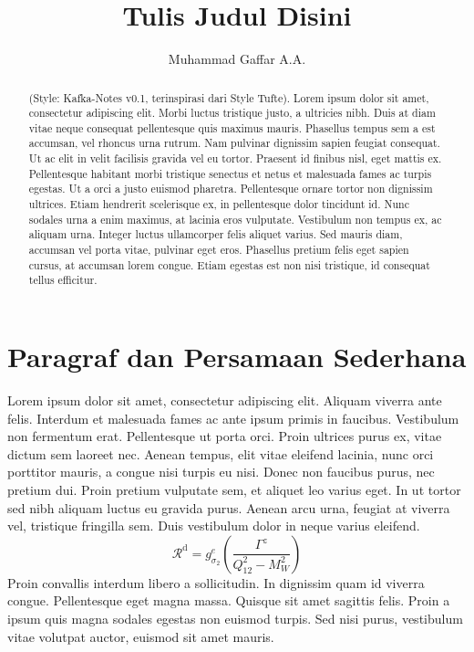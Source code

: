\documentclass{article}
\title{Tulis Judul Disini}
\author{Muhammad Gaffar A.A.}
\begin{document}
\begin{titlepage}
\thispagestyle{empty}
\maketitle
\begin{abstract}
(Style: Kafka-Notes v0.1, terinspirasi dari Style Tufte). Lorem ipsum dolor sit amet, consectetur adipiscing elit. Morbi luctus tristique justo, a ultricies nibh. Duis at diam vitae neque consequat pellentesque quis maximus mauris. Phasellus tempus sem a est accumsan, vel rhoncus urna rutrum. Nam pulvinar dignissim sapien feugiat consequat. Ut ac elit in velit facilisis gravida vel eu tortor. Praesent id finibus nisl, eget mattis ex. Pellentesque habitant morbi tristique senectus et netus et malesuada fames ac turpis egestas. Ut a orci a justo euismod pharetra. Pellentesque ornare tortor non dignissim ultrices. Etiam hendrerit scelerisque ex, in pellentesque dolor tincidunt id. Nunc sodales urna a enim maximus, at lacinia eros vulputate. Vestibulum non tempus ex, ac aliquam urna. Integer luctus ullamcorper felis aliquet varius. Sed mauris diam, accumsan vel porta vitae, pulvinar eget eros. Phasellus pretium felis eget sapien cursus, at accumsan lorem congue. Etiam egestas est non nisi tristique, id consequat tellus efficitur. 
\end{abstract}

\tableofcontents
\end{titlepage}


\section{Paragraf dan Persamaan Sederhana}
Lorem ipsum dolor sit amet, consectetur adipiscing elit. Aliquam viverra ante felis. Interdum et malesuada fames ac ante ipsum primis in faucibus. Vestibulum non fermentum erat. Pellentesque ut porta orci. Proin ultrices purus ex, vitae dictum sem laoreet nec. Aenean tempus, elit vitae eleifend lacinia, nunc orci porttitor mauris, a congue nisi turpis eu nisi. Donec non faucibus purus, nec pretium dui. Proin pretium vulputate sem, et aliquet leo varius eget. In ut tortor sed nibh aliquam luctus eu gravida purus. Aenean arcu urna, feugiat at viverra vel, tristique fringilla sem. Duis vestibulum dolor in neque varius eleifend. 
\begin{equation}
\mathcal{R}^{\text{d}} = g^e_{\sigma_{2}}\left(\frac{\Gamma^z}{Q_{12}^2-M_W^2}\right)
\end{equation}
Proin convallis interdum libero a sollicitudin. In dignissim quam id viverra congue. Pellentesque eget magna massa. Quisque sit amet sagittis felis. Proin a ipsum quis magna sodales egestas non euismod turpis. Sed nisi purus, vestibulum vitae volutpat auctor, euismod sit amet mauris. 
\end{document}
